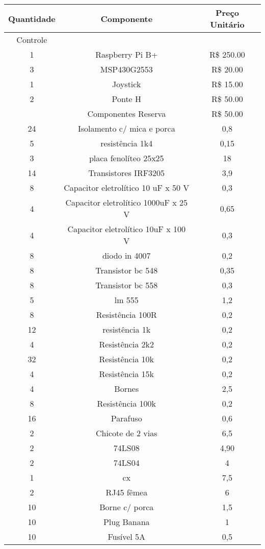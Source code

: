 \begin{longtable}{|c|c|c|} 
\hline
Quantidade & Componente & Preço Unitário \\ \hline
Controle &  &  \\
1 & Raspberry Pi B+ & R\$ 250.00 \\
3 & MSP430G2553 & R\$ 20.00 \\
1 & Joystick & R\$ 15.00 \\
2 & Ponte H & R\$ 50.00 \\
 & Componentes Reserva & R\$ 50.00 \\
24 & Isolamento c/ mica e porca & 0,8 \\
5 & resistência 1k4 & 0,15 \\
3 & placa fenolíteo 25x25 & 18 \\
14 & Transistores IRF3205 & 3,9 \\
8 & Capacitor eletrolítico 10 uF x 50 V & 0,3 \\
4 & Capacitor eletrolítico 1000uF x 25 V & 0,65 \\
4 & Capacitor eletrolítico 10uF x 100 V & 0,3 \\
8 & diodo in 4007 & 0,2 \\
8 & Transistor bc 548 & 0,35 \\
8 & Transistor bc 558 & 0,3 \\
5 & lm 555 & 1,2 \\
8 & Resistência 100R & 0,2 \\
12 & resistência 1k & 0,2 \\
4 & Resistência 2k2 & 0,2 \\
32 & Resistência 10k & 0,2 \\
4 & Resistência 15k & 0,2 \\
4 & Bornes & 2,5 \\
8 & Resistência 100k & 0,2 \\
16 & Parafuso & 0,6 \\
2 & Chicote de 2 vias & 6,5 \\
2 & 74LS08 & 4,90 \\
2 & 74LS04 & 4 \\
1 & cx & 7,5 \\
2 & RJ45 fêmea & 6 \\
10 & Borne c/ porca & 1,5 \\
10 & Plug Banana & 1 \\
10 & Fusível 5A & 0,5 \\

\end{longtable}
